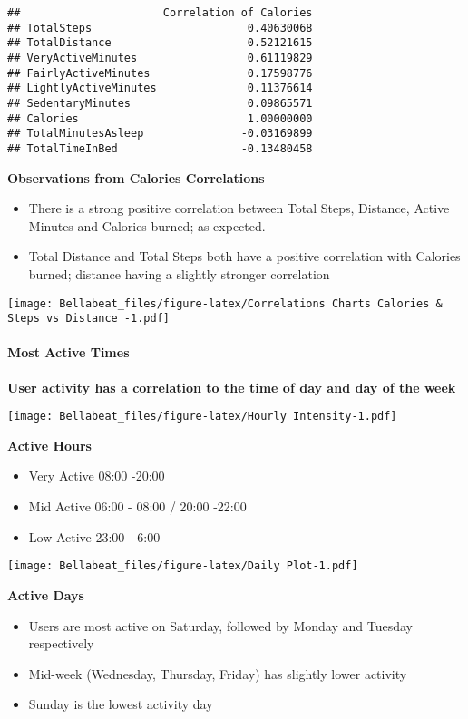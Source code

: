 \documentclass[
]{article}
\providecommand{\tightlist}{%
  \setlength{\itemsep}{0pt}\setlength{\parskip}{0pt}}
\begin{document}
\begin{verbatim}
##                      Correlation of Calories
## TotalSteps                        0.40630068
## TotalDistance                     0.52121615
## VeryActiveMinutes                 0.61119829
## FairlyActiveMinutes               0.17598776
## LightlyActiveMinutes              0.11376614
## SedentaryMinutes                  0.09865571
## Calories                          1.00000000
## TotalMinutesAsleep               -0.03169899
## TotalTimeInBed                   -0.13480458
\end{verbatim}

\textbf{Observations from Calories Correlations}

\begin{itemize}
\tightlist
\item
  There is a strong positive correlation between Total Steps, Distance,
  Active Minutes and Calories burned; as expected.
\item
  Total Distance and Total Steps both have a positive correlation with
  Calories burned; distance having a slightly stronger correlation
\end{itemize}

\texttt{[image: Bellabeat\_files/figure-latex/Correlations Charts Calories \& Steps vs Distance -1.pdf]}

\paragraph{\texorpdfstring{\textbf{Most Active Times}\\
}{Most Active Times }}\label{most-active-times}

\textbf{User activity has a correlation to the time of day and day of
the week}

\texttt{[image: Bellabeat\_files/figure-latex/Hourly Intensity-1.pdf]}

\textbf{Active Hours}

\begin{itemize}
\tightlist
\item
  Very Active 08:00 -20:00
\item
  Mid Active 06:00 - 08:00 / 20:00 -22:00
\item
  Low Active 23:00 - 6:00
\end{itemize}

\texttt{[image: Bellabeat\_files/figure-latex/Daily Plot-1.pdf]}

\textbf{Active Days}

\begin{itemize}
\tightlist
\item
  Users are most active on Saturday, followed by Monday and Tuesday
  respectively
\item
  Mid-week (Wednesday, Thursday, Friday) has slightly lower activity
\item
  Sunday is the lowest activity day
\end{itemize}
\end{document}
